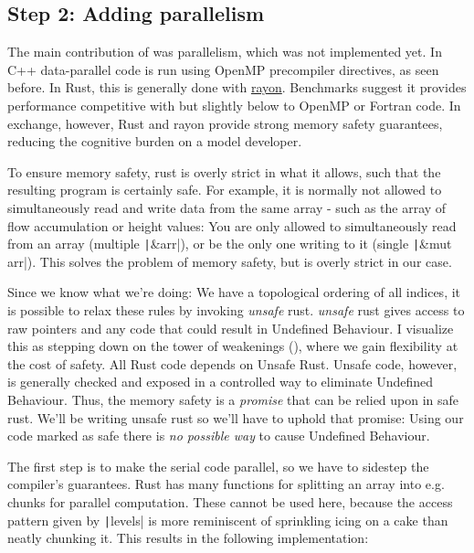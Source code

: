 \documentclass[a4paper]{article} %
\begin{document}
\subsection{Step 2: Adding parallelism}

The main contribution of \cite{barnesAcceleratingFluvialIncision2019} was parallelism, which was not implemented yet. In C++ data-parallel code is run using OpenMP precompiler directives, as seen before. In Rust, this is generally done with \href{https://github.com/rayon-rs/rayon}{rayon}. Benchmarks suggest it provides performance competitive with but slightly below to OpenMP or Fortran code\cite{martinsNPBRustNASParallel2025}. In exchange, however, Rust and rayon provide strong memory safety guarantees, reducing the cognitive burden on a model developer.

To ensure memory safety, rust is overly strict in what it allows, such that the resulting program is certainly safe. For example, it is normally not allowed to simultaneously read and write data from the same array - such as the array of flow accumulation or height values: You are only allowed to simultaneously read from an array (multiple \texttt|&arr|), or be the only one writing to it (single \texttt|&mut arr|). This solves the problem of memory safety, but is overly strict in our case.

Since we know what we're doing: We have a topological ordering of all indices, it is possible to relax these rules by invoking \textit{unsafe} rust. \textit{unsafe} rust gives access to raw pointers and any code that could result in Undefined Behaviour. I visualize this as stepping down on the tower of weakenings (\cite{desiresTowerWeakeningsMemoryb}), where we gain flexibility at the cost of safety. All Rust code depends on Unsafe Rust. Unsafe code, however, is generally checked and exposed in a controlled way to eliminate Undefined Behaviour. Thus, the memory safety is a \textit{promise} that can be relied upon in safe rust. We'll be writing unsafe rust so we'll have to uphold that promise: Using our code marked as safe there is \textit{no possible way} to cause Undefined Behaviour.

The first step is to make the serial code parallel, so we have to sidestep the compiler's guarantees. Rust has many functions for splitting an array into e.g. chunks for parallel computation. These cannot be used here, because the access pattern given by \texttt|levels| is more reminiscent of sprinkling icing on a cake than neatly chunking it. This results in the following implementation:
\end{document}
